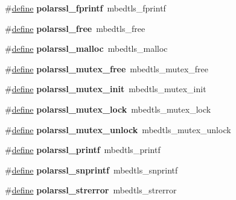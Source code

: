 \begin{DoxyCompactItemize}
\#\hyperlink{structdefine}{define} {\bfseries polarssl\+\_\+fprintf}~mbedtls\+\_\+fprintf
\item 
\mbox{\label{compat-1_83_8h_a3c8219c194813f302bf78fe73566cb2d}} 
\#\hyperlink{structdefine}{define} {\bfseries polarssl\+\_\+free}~mbedtls\+\_\+free
\item 
\mbox{\label{compat-1_83_8h_a2a0cfb9e59f28e2a1a5fd1880fb20d4b}} 
\#\hyperlink{structdefine}{define} {\bfseries polarssl\+\_\+malloc}~mbedtls\+\_\+malloc
\item 
\mbox{\label{compat-1_83_8h_a499220b866b06decc2665f2192f453fb}} 
\#\hyperlink{structdefine}{define} {\bfseries polarssl\+\_\+mutex\+\_\+free}~mbedtls\+\_\+mutex\+\_\+free
\item 
\mbox{\label{compat-1_83_8h_a7bede0c29df31f17c1e93ec10f2c334e}} 
\#\hyperlink{structdefine}{define} {\bfseries polarssl\+\_\+mutex\+\_\+init}~mbedtls\+\_\+mutex\+\_\+init
\item 
\mbox{\label{compat-1_83_8h_a112d459d01def062aec588fe0483aa0d}} 
\#\hyperlink{structdefine}{define} {\bfseries polarssl\+\_\+mutex\+\_\+lock}~mbedtls\+\_\+mutex\+\_\+lock
\item 
\mbox{\label{compat-1_83_8h_a42557dfbaa55c9c67f3b1c70d9bbbcc4}} 
\#\hyperlink{structdefine}{define} {\bfseries polarssl\+\_\+mutex\+\_\+unlock}~mbedtls\+\_\+mutex\+\_\+unlock
\item 
\mbox{\label{compat-1_83_8h_afc6a7362c0f0c9cfa8fc76b3281e2b37}} 
\#\hyperlink{structdefine}{define} {\bfseries polarssl\+\_\+printf}~mbedtls\+\_\+printf
\item 
\mbox{\label{compat-1_83_8h_a325a816132b264186c711bf1d131987c}} 
\#\hyperlink{structdefine}{define} {\bfseries polarssl\+\_\+snprintf}~mbedtls\+\_\+snprintf
\item 
\mbox{\label{compat-1_83_8h_aaa94f3f8ce3b8c125b975e53cc1d7c9c}} 
\#\hyperlink{structdefine}{define} {\bfseries polarssl\+\_\+strerror}~mbedtls\+\_\+strerror
\item 
\mbox{\label{compat-1_83_8h_a53a397703a6eca99f8eaf7916e7185ad}} 

\end{DoxyCompactItemize}
